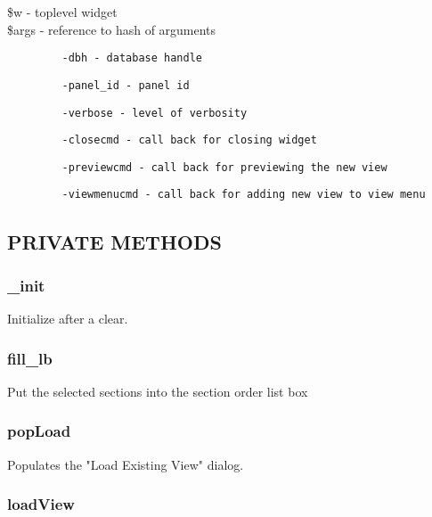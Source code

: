 \documentclass{article}
\begin{document}
\begin{description}

\item[{\$w - toplevel widget}] \mbox{}
\item[{\$args - reference to hash of arguments}] \mbox{}\begin{verbatim}
   -dbh - database handle
\end{verbatim}
\begin{verbatim}
   -panel_id - panel id
\end{verbatim}
\begin{verbatim}
   -verbose - level of verbosity
\end{verbatim}
\begin{verbatim}
   -closecmd - call back for closing widget
\end{verbatim}
\begin{verbatim}
   -previewcmd - call back for previewing the new view
\end{verbatim}
\begin{verbatim}
   -viewmenucmd - call back for adding new view to view menu
\end{verbatim}
\end{description}
\subsection*{PRIVATE METHODS\label{BuildView_PRIVATE_METHODS}}
\subsubsection*{\_init\label{BuildView__init}}


Initialize after a clear.

\subsubsection*{fill\_lb\label{BuildView_fill_lb}}


Put the selected sections into the section order list box

\subsubsection*{popLoad\label{BuildView_popLoad}}


Populates the "Load Existing View" dialog.

\subsubsection*{loadView\label{BuildView_loadView}}
\end{document}
